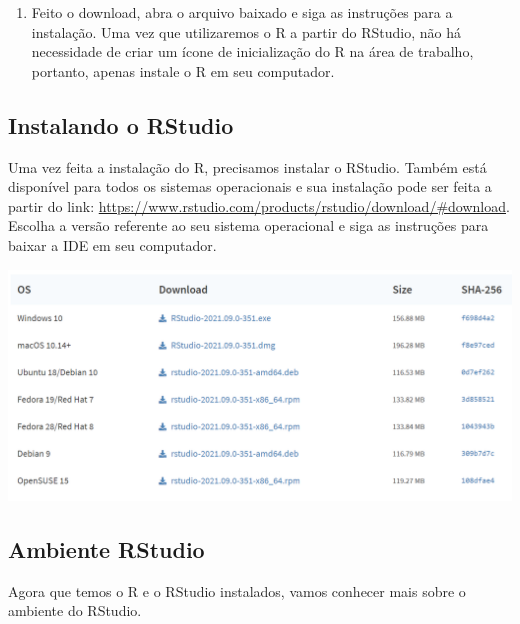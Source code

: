 \documentclass[
  brazilian,
]{book}
\providecommand{\tightlist}{%
  \setlength{\itemsep}{0pt}\setlength{\parskip}{0pt}}
\let\origfigure\figure
\let\endorigfigure\endfigure
\renewenvironment{figure}[1][2] {
    \expandafter\origfigure\expandafter[H]
} {
    \endorigfigure
}
\begin{document}
\begin{enumerate}
\def\labelenumi{\arabic{enumi}.}
\setcounter{enumi}{5}
\tightlist
\item
  Feito o download, abra o arquivo baixado e siga as instruções para a instalação. Uma vez que utilizaremos o R a partir do RStudio, não há necessidade de criar um ícone de inicialização do R na área de trabalho, portanto, apenas instale o R em seu computador.
\end{enumerate}

\hypertarget{instalando-o-rstudio}{%
\subsection{Instalando o RStudio}\label{instalando-o-rstudio}}

Uma vez feita a instalação do R, precisamos instalar o RStudio. Também está disponível para todos os sistemas operacionais e sua instalação pode ser feita a partir do link: \url{https://www.rstudio.com/products/rstudio/download/\#download}. Escolha a versão referente ao seu sistema operacional e siga as instruções para baixar a IDE em seu computador.

\begin{figure}

{\centering \includegraphics[width=0.8\linewidth]{imagens/rstudio_download} 

}

\caption{Na página referente ao link acima, vá até a seção ilustrada na figura. Lá encontraremos as versões disponíveis do RStudio, de acordo com o sistema operacional.}\label{fig:unnamed-chunk-2}
\end{figure}

\hypertarget{rstudio}{%
\subsection{Ambiente RStudio}\label{rstudio}}

Agora que temos o R e o RStudio instalados, vamos conhecer mais sobre o ambiente do RStudio.
\end{document}
